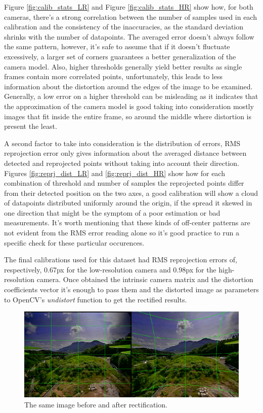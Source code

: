 Figure \ref{fig:calib_stats_LR} and Figure \ref{fig:calib_stats_HR} show how, for both cameras, there's a strong correlation between the number of samples used in each calibration and the consistency of the inaccuracies, as the standard deviation shrinks with the number of datapoints. The averaged error doesn't always follow the same pattern, however, it's safe to assume that if it doesn't fluctuate excessively, a larger set of corners guarantees a better generalization of the camera model. Also, higher thresholds generally yield better results as single frames contain more correlated points, unfortunately, this leads to less information about the distortion around the edges of the image to be examined. Generally, a low error on a higher threshold can be misleading as it indicates that the approximation of the camera model is good taking into consideration mostly images that fit inside the entire frame, so around the middle where distortion is present the least.

A second factor to take into consideration is the distribution of errors, RMS reprojection error only gives information about the averaged distance between detected and reprojected points without taking into account their direction. Figures \ref{fig:reprj_dist_LR} and \ref{fig:reprj_dist_HR} show how for each combination of threshold and number of samples the reprojected points differ from their detected position on the two axes, a good calibration will show a cloud of datapoints distributed uniformly around the origin, if the spread it skewed in one direction that might be the symptom of a poor estimation or bad measurements. It's worth mentioning that these kinds of off-center patterns are not evident from the RMS error reading alone so it's good practice to run a specific check for these particular occurences.

The final calibrations used for this dataset had RMS reprojection errors of, respectively, 0.67px for the low-resolution camera and 0.98px for the high-resolution camera. Once obtained the intrinsic camera matrix and the distortion coefficients vector it's enough to pass them and the distorted image as parameters to OpenCV's \emph{undistort} function to get the rectified results.

\begin{figure}[H]
  \centering
  \includegraphics[width=1\textwidth]{figures/bef_aft_rect.png}
  \caption{The same image before and after rectification.}
  \label{img:rectify_sbs}
\end{figure}

